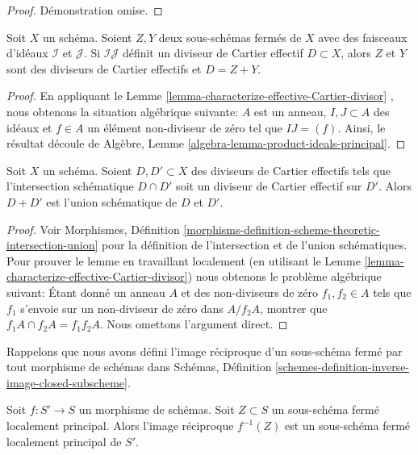 \begin{proof}
Démonstration omise.
\end{proof}

\begin{lemma}
\label{lemma-sum-closed-subschemes-effective-Cartier}
Soit  $X$  un schéma. Soient  $Z, Y$  deux sous-schémas fermés de
 $X$  avec des faisceaux d'idéaux  $\mathcal{I}$  et  $\mathcal{J}$. Si
 $\mathcal{I}\mathcal{J}$  définit un diviseur de Cartier effectif  $D \subset X$, alors
 $Z$  et  $Y$  sont des diviseurs de Cartier effectifs et
 $D = Z + Y$.
\end{lemma}

\begin{proof}
En appliquant le Lemme  \ref{lemma-characterize-effective-Cartier-divisor} , nous obtenons la situation algébrique
suivante:  $A$  est un anneau,  $I, J \subset A$  des idéaux et  $f \in A$  un
élément non-diviseur de zéro tel que  $IJ = (f)$. Ainsi, le résultat découle de
Algèbre, Lemme  \ref{algebra-lemma-product-ideals-principal}.
\end{proof}

\begin{lemma}
\label{lemma-sum-effective-Cartier-divisors-union}
Soit  $X$  un schéma. Soient  $D, D' \subset X$  des diviseurs de Cartier
effectifs tels que l'intersection schématique  $D \cap D'$  soit un diviseur de
Cartier effectif sur  $D'$. Alors  $D + D'$  est l'union schématique de
 $D$  et  $D'$.
\end{lemma}

\begin{proof}
Voir Morphismes, Définition  \ref{morphisms-definition-scheme-theoretic-intersection-union}  pour la définition de l'intersection et
de l'union schématiques. Pour prouver le lemme en travaillant localement (en
utilisant le Lemme  \ref{lemma-characterize-effective-Cartier-divisor}) nous obtenons le problème algébrique suivant:
Étant donné un anneau  $A$  et des non-diviseurs de zéro  $f_1, f_2 \in A$  tels
que  $f_1$  s'envoie sur un non-diviseur de zéro dans  $A/f_2A$, montrer
que  $f_1A \cap f_2A = f_1f_2A$. Nous omettons l'argument direct.
\end{proof}

\noindent
Rappelons que nous avons défini l'image réciproque d'un sous-schéma fermé par
tout morphisme de schémas dans Schémas, Définition  \ref{schemes-definition-inverse-image-closed-subscheme}.

\begin{lemma}
\label{lemma-pullback-locally-principal}
Soit  $f : S' \to S$  un morphisme de schémas. Soit  $Z \subset S$  un sous-schéma fermé
localement principal. Alors l'image réciproque  $f^{-1}(Z)$  est un sous-schéma fermé
localement principal de  $S'$.
\end{lemma}


